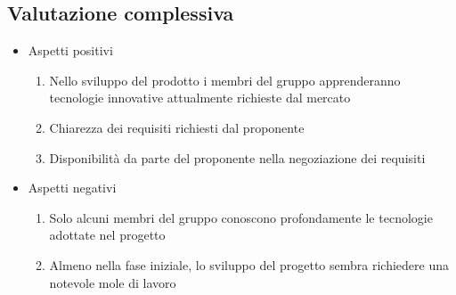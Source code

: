 \subsection{Valutazione complessiva}
\begin{itemize}
\item Aspetti positivi
  \begin{enumerate}
    \item Nello sviluppo del prodotto i membri del gruppo apprenderanno tecnologie innovative 
      attualmente richieste dal mercato
    \item Chiarezza dei requisiti richiesti dal proponente
    \item Disponibilit\`a da parte del proponente nella negoziazione dei requisiti
  \end{enumerate}
\item{Aspetti negativi}
  \begin{enumerate}
    \item Solo alcuni membri del gruppo conoscono profondamente le tecnologie adottate nel progetto
    \item Almeno nella fase iniziale, lo sviluppo del progetto sembra richiedere una notevole mole di lavoro
  \end{enumerate}
\end{itemize}
